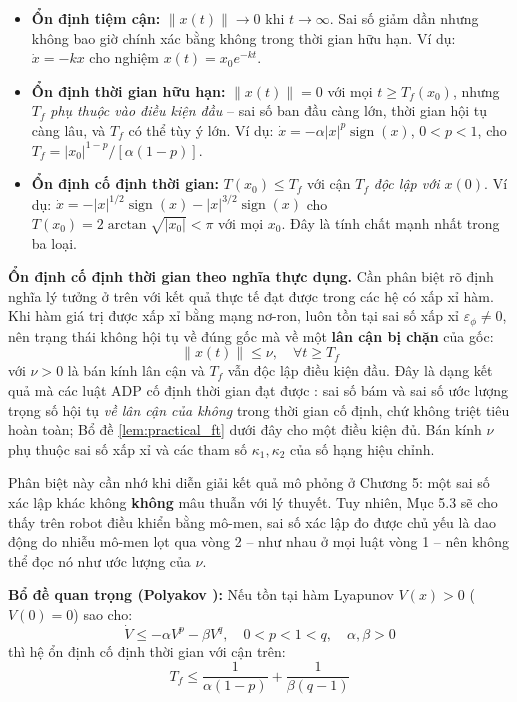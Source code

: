 \documentclass[12pt,a4paper]{article}
\DeclareMathOperator{\sign}{sign}
\begin{document}
\begin{itemize}
    \item \textbf{Ổn định tiệm cận:} $\|x(t)\| \to 0$ khi $t \to \infty$. Sai số giảm dần nhưng không bao giờ chính xác bằng không trong thời gian hữu hạn. Ví dụ: $\dot{x} = -kx$ cho nghiệm $x(t) = x_0 e^{-kt}$.

    \item \textbf{Ổn định thời gian hữu hạn:} $\|x(t)\| = 0$ với mọi $t \geq T_f(x_0)$, nhưng $T_f$ \textit{phụ thuộc vào điều kiện đầu} -- sai số ban đầu càng lớn, thời gian hội tụ càng lâu, và $T_f$ có thể tùy ý lớn. Ví dụ: $\dot{x} = -\alpha|x|^p \sign(x)$, $0 < p < 1$, cho $T_f = |x_0|^{1-p}/[\alpha(1-p)]$.

    \item \textbf{Ổn định cố định thời gian:} $T(x_0) \leq T_f$ với cận $T_f$ \textit{độc lập với $x(0)$}. Ví dụ: $\dot{x} = -|x|^{1/2}\sign(x) - |x|^{3/2}\sign(x)$ cho $T(x_0) = 2\arctan\sqrt{|x_0|} < \pi$ với mọi $x_0$. Đây là tính chất mạnh nhất trong ba loại.
\end{itemize}

\textbf{Ổn định cố định thời gian theo nghĩa thực dụng.} Cần phân biệt rõ định nghĩa lý tưởng ở trên với kết quả thực tế đạt được trong các hệ có xấp xỉ hàm. Khi hàm giá trị được xấp xỉ bằng mạng nơ-ron, luôn tồn tại sai số xấp xỉ $\varepsilon_\phi \neq 0$, nên trạng thái không hội tụ về đúng gốc mà về một \textbf{lân cận bị chặn} của gốc:
\begin{equation}\label{eq:practical_ft}
    \|x(t)\| \leq \nu, \quad \forall t \geq T_f
\end{equation}
với $\nu > 0$ là bán kính lân cận và $T_f$ vẫn độc lập điều kiện đầu. Đây là dạng kết quả mà các luật ADP cố định thời gian đạt được \cite{Wang2025}: sai số bám và sai số ước lượng trọng số hội tụ \textit{về lân cận của không} trong thời gian cố định, chứ không triệt tiêu hoàn toàn; Bổ đề \ref{lem:practical_ft} dưới đây cho một điều kiện đủ. Bán kính $\nu$ phụ thuộc sai số xấp xỉ và các tham số $\kappa_1, \kappa_2$ của số hạng hiệu chỉnh.

Phân biệt này cần nhớ khi diễn giải kết quả mô phỏng ở Chương 5: một sai số xác lập khác không \textbf{không} mâu thuẫn với lý thuyết. Tuy nhiên, Mục 5.3 sẽ cho thấy trên robot điều khiển bằng mô-men, sai số xác lập đo được chủ yếu là dao động do nhiễu mô-men lọt qua vòng 2 -- như nhau ở mọi luật vòng 1 -- nên không thể đọc nó như ước lượng của $\nu$.

\textbf{Bổ đề quan trọng (Polyakov \cite{Polyakov2012}):} Nếu tồn tại hàm Lyapunov $V(x) > 0$ ($V(0) = 0$) sao cho:
\begin{equation}\label{eq:ft_lyapunov}
    \dot{V} \leq -\alpha V^p - \beta V^q, \quad 0 < p < 1 < q, \quad \alpha, \beta > 0
\end{equation}
thì hệ ổn định cố định thời gian với cận trên:
\begin{equation}\label{eq:ft_bound}
    T_f \leq \frac{1}{\alpha(1-p)} + \frac{1}{\beta(q-1)}
\end{equation}
\end{document}
